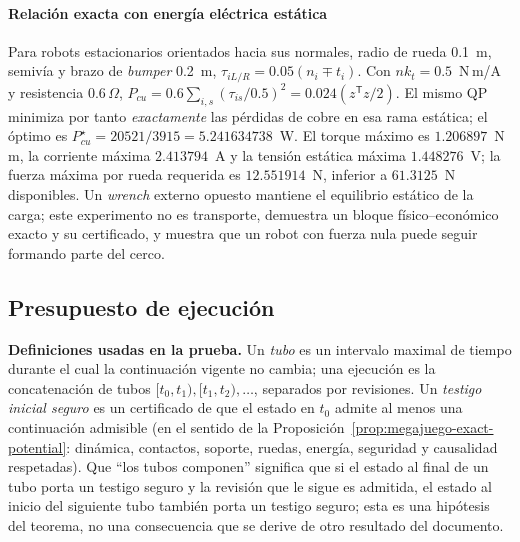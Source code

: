 \paragraph{Relación exacta con energía eléctrica estática}
Para robots estacionarios orientados hacia sus normales, radio de rueda
0.1~m, semivía y brazo de \emph{bumper} 0.2~m,
$\tau_{iL/R}=0.05(n_i\mp t_i)$. Con $nk_t=0.5$~N\,m/A y resistencia
$0.6\,\Omega$, $P_{cu}=0.6\sum_{i,s}(\tau_{is}/0.5)^2=0.024(z^{\mathsf T}z/2)$.
El mismo QP minimiza por tanto \emph{exactamente} las pérdidas de cobre en esa
rama estática; el óptimo es $P_{cu}^\star=20521/3915=5.241634738$~W. El
torque máximo es $1.206897$~N\,m, la corriente máxima $2.413794$~A y la
tensión estática máxima $1.448276$~V; la fuerza máxima por rueda requerida es
$12.551914$~N, inferior a $61.3125$~N disponibles. Un \emph{wrench} externo
opuesto mantiene el equilibrio estático de la carga; este experimento no es
transporte, demuestra un bloque físico--económico exacto y su certificado,
y muestra que un robot con fuerza nula puede seguir formando parte del cerco.

\subsection{Presupuesto de ejecución}
\label{app:megajuego-budget-proof}

\textbf{Definiciones usadas en la prueba.} Un \emph{tubo} es un intervalo
maximal de tiempo durante el cual la continuación vigente no cambia; una
ejecución es la concatenación de tubos $[t_0,t_1),[t_1,t_2),\ldots$, separados
por revisiones. Un \emph{testigo inicial seguro} es un certificado de que el
estado en $t_0$ admite al menos una continuación admisible (en el sentido de
la Proposición~\ref{prop:megajuego-exact-potential}: dinámica, contactos,
soporte, ruedas, energía, seguridad y causalidad respetadas). Que ``los tubos
componen'' significa que si el estado al final de un tubo porta un testigo
seguro y la revisión que le sigue es admitida, el estado al inicio del
siguiente tubo también porta un testigo seguro; esta es una hipótesis del
teorema, no una consecuencia que se derive de otro resultado del documento.

